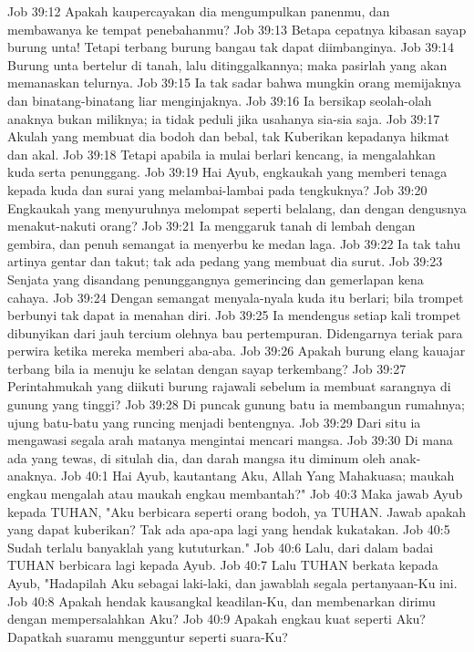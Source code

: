 Job 39:12  Apakah kaupercayakan dia mengumpulkan panenmu, dan membawanya ke tempat penebahanmu?
Job 39:13  Betapa cepatnya kibasan sayap burung unta! Tetapi terbang burung bangau tak dapat diimbanginya.
Job 39:14  Burung unta bertelur di tanah, lalu ditinggalkannya; maka pasirlah yang akan memanaskan telurnya.
Job 39:15  Ia tak sadar bahwa mungkin orang memijaknya dan binatang-binatang liar menginjaknya.
Job 39:16  Ia bersikap seolah-olah anaknya bukan miliknya; ia tidak peduli jika usahanya sia-sia saja.
Job 39:17  Akulah yang membuat dia bodoh dan bebal, tak Kuberikan kepadanya hikmat dan akal.
Job 39:18  Tetapi apabila ia mulai berlari kencang, ia mengalahkan kuda serta penunggang.
Job 39:19  Hai Ayub, engkaukah yang memberi tenaga kepada kuda dan surai yang melambai-lambai pada tengkuknya?
Job 39:20  Engkaukah yang menyuruhnya melompat seperti belalang, dan dengan dengusnya menakut-nakuti orang?
Job 39:21  Ia menggaruk tanah di lembah dengan gembira, dan penuh semangat ia menyerbu ke medan laga.
Job 39:22  Ia tak tahu artinya gentar dan takut; tak ada pedang yang membuat dia surut.
Job 39:23  Senjata yang disandang penunggangnya gemerincing dan gemerlapan kena cahaya.
Job 39:24  Dengan semangat menyala-nyala kuda itu berlari; bila trompet berbunyi tak dapat ia menahan diri.
Job 39:25  Ia mendengus setiap kali trompet dibunyikan dari jauh tercium olehnya bau pertempuran. Didengarnya teriak para perwira ketika mereka memberi aba-aba.
Job 39:26  Apakah burung elang kauajar terbang bila ia menuju ke selatan dengan sayap terkembang?
Job 39:27  Perintahmukah yang diikuti burung rajawali sebelum ia membuat sarangnya di gunung yang tinggi?
Job 39:28  Di puncak gunung batu ia membangun rumahnya; ujung batu-batu yang runcing menjadi bentengnya.
Job 39:29  Dari situ ia mengawasi segala arah matanya mengintai mencari mangsa.
Job 39:30  Di mana ada yang tewas, di situlah dia, dan darah mangsa itu diminum oleh anak-anaknya.
Job 40:1  Hai Ayub, kautantang Aku, Allah Yang Mahakuasa; maukah engkau mengalah atau maukah engkau membantah?"
Job 40:3  Maka jawab Ayub kepada TUHAN, "Aku berbicara seperti orang bodoh, ya TUHAN. Jawab apakah yang dapat kuberikan? Tak ada apa-apa lagi yang hendak kukatakan.
Job 40:5  Sudah terlalu banyaklah yang kututurkan."
Job 40:6  Lalu, dari dalam badai TUHAN berbicara lagi kepada Ayub.
Job 40:7  Lalu TUHAN berkata kepada Ayub, "Hadapilah Aku sebagai laki-laki, dan jawablah segala pertanyaan-Ku ini.
Job 40:8  Apakah hendak kausangkal keadilan-Ku, dan membenarkan dirimu dengan mempersalahkan Aku?
Job 40:9  Apakah engkau kuat seperti Aku? Dapatkah suaramu mengguntur seperti suara-Ku?
